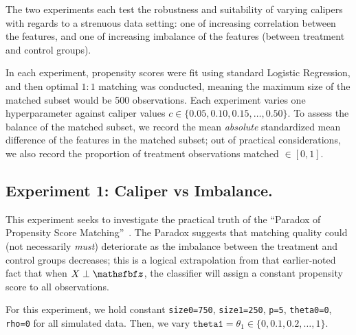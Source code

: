 \documentclass[11pt]{extarticle}
\begin{document}
The two experiments each test the robustness and suitability of varying calipers with regards to a strenuous data setting: one of increasing correlation between the features, and one of increasing imbalance of the features (between treatment and control groups).

In each experiment, propensity scores were fit using standard Logistic Regression, and then optimal $1:1$ matching was conducted, meaning the maximum size of the matched subset would be 500 observations. Each experiment varies one hyperparameter against caliper values $c \in \{0.05, 0.10, 0.15, \ldots, 0.50\}$. To assess the balance of the matched subset, we record the mean \emph{absolute} standardized mean difference of the features in the matched subset; out of practical considerations, we also record the proportion of treatment observations matched $\in [0, 1]$.

\subsection{Experiment 1: Caliper vs Imbalance.}
This experiment seeks to investigate the practical truth of the ``Paradox of Propensity Score Matching''~\parencite{king_why_2019}. The Paradox suggests that matching quality could (not necessarily \emph{must}) deteriorate as the imbalance between the treatment and control groups decreases; this is a logical extrapolation from that earlier-noted fact that when $\mat{X} \perp \vec{z}$, the classifier will assign a constant propensity score to all observations.

For this experiment, we hold constant \texttt{size0=750}, \texttt{size1=250}, \texttt{p=5}, \texttt{theta0=0}, \texttt{rho=0} for all simulated data.
Then, we vary $\texttt{theta1} = \theta_1 \in \{0, 0.1, 0.2, \ldots, 1\}$.
\end{document}
